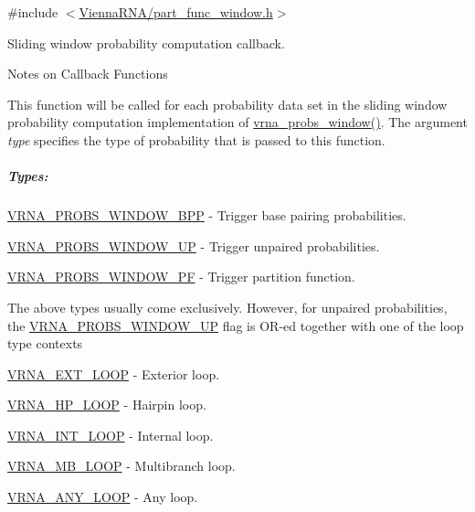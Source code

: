 {\ttfamily \#include $<$\hyperlink{part__func__window_8h}{Vienna\+R\+N\+A/part\+\_\+func\+\_\+window.\+h}$>$}



Sliding window probability computation callback. 

\begin{DoxyRefDesc}{Notes on Callback Functions}
\item[\hyperlink{callbacks__callbacks000004}{Notes on Callback Functions}]This function will be called for each probability data set in the sliding window probability computation implementation of \hyperlink{group__part__func__window_ga7115d012988541a65ec323c5f17a334b}{vrna\+\_\+probs\+\_\+window()}. The argument {\itshape type} specifies the type of probability that is passed to this function. \end{DoxyRefDesc}


\subparagraph*{Types\+:}


\begin{DoxyItemize}
\item \hyperlink{group__part__func__window_ga296217b76e76e5f7e6927e7210aa9b1f}{V\+R\+N\+A\+\_\+\+P\+R\+O\+B\+S\+\_\+\+W\+I\+N\+D\+O\+W\+\_\+\+B\+PP} -\/ Trigger base pairing probabilities.
\item \hyperlink{group__part__func__window_ga18325811c7dfc7b7d9d4ac37f4353615}{V\+R\+N\+A\+\_\+\+P\+R\+O\+B\+S\+\_\+\+W\+I\+N\+D\+O\+W\+\_\+\+UP} -\/ Trigger unpaired probabilities.
\item \hyperlink{group__part__func__window_ga4b79137d9b28b1f9cac7983792ce34a0}{V\+R\+N\+A\+\_\+\+P\+R\+O\+B\+S\+\_\+\+W\+I\+N\+D\+O\+W\+\_\+\+PF} -\/ Trigger partition function.
\end{DoxyItemize}

The above types usually come exclusively. However, for unpaired probabilities, the \hyperlink{group__part__func__window_ga18325811c7dfc7b7d9d4ac37f4353615}{V\+R\+N\+A\+\_\+\+P\+R\+O\+B\+S\+\_\+\+W\+I\+N\+D\+O\+W\+\_\+\+UP} flag is O\+R-\/ed together with one of the loop type contexts


\begin{DoxyItemize}
\item \hyperlink{group__part__func__window_gaf0bb577130090f6c856d1358804250bf}{V\+R\+N\+A\+\_\+\+E\+X\+T\+\_\+\+L\+O\+OP} -\/ Exterior loop.
\item \hyperlink{group__part__func__window_ga30170811c320f3a7b23ffff3b3343b91}{V\+R\+N\+A\+\_\+\+H\+P\+\_\+\+L\+O\+OP} -\/ Hairpin loop.
\item \hyperlink{group__part__func__window_ga956a237e7d956b684b7d593cb3eca665}{V\+R\+N\+A\+\_\+\+I\+N\+T\+\_\+\+L\+O\+OP} -\/ Internal loop.
\item \hyperlink{group__part__func__window_gad905b71f02b3799eb84b490435aec837}{V\+R\+N\+A\+\_\+\+M\+B\+\_\+\+L\+O\+OP} -\/ Multibranch loop.
\item \hyperlink{group__part__func__window_ga1fef1ad234755db78ab6b695edce5080}{V\+R\+N\+A\+\_\+\+A\+N\+Y\+\_\+\+L\+O\+OP} -\/ Any loop.
\end{DoxyItemize}

